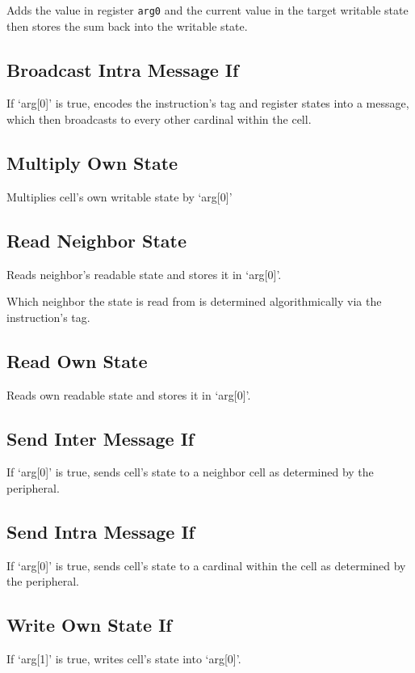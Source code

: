 Adds the value in register \texttt{arg0} and the current value in the target writable state then stores the sum back into the writable state.

\subsection{Broadcast Intra Message If}


If `arg[0]' is true, encodes the instruction's tag and register states into a message, which then broadcasts to every other cardinal within the cell.


\subsection{Multiply Own State}


Multiplies cell's own writable state by `arg[0]'

\subsection{Read Neighbor State}


Reads neighbor's readable state and stores it in `arg[0]'.

Which neighbor the state is read from is determined algorithmically via the instruction's tag.

\subsection{Read Own State}


Reads own readable state and stores it in `arg[0]'.

\subsection{Send Inter Message If}


If `arg[0]' is true, sends cell's state to a neighbor cell as determined by the peripheral.

\subsection{Send Intra Message If}


If `arg[0]' is true, sends cell's state to a cardinal within the cell as determined by the peripheral.

\subsection{Write Own State If}


If `arg[1]' is true, writes cell's state into `arg[0]'.

